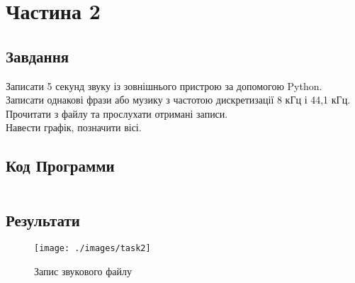 \section{Частина 2}
\label{sec:task2}

\subsection{Завдання}
\label{subsec:task2_task}

Записати 5 секунд звуку із зовнішнього пристрою за допомогою Python. \\
Записати однакові фрази або музику з частотою дискретизації 8 кГц і 44,1 кГц. \\
Прочитати з файлу та прослухати отримані записи. \\
Навести графік, позначити вісі.

\subsection{Код Программи}
\label{subsec:task2_code}
\inputminted{python}{../src/task2.py}

\subsection{Результати}
\label{subsec:task2_results}

\begin{figure}[!ht]
    \centering
    \texttt{[image: ./images/task2]}
    \caption{Запис звукового файлу}
    \label{fig:recording}
\end{figure}
